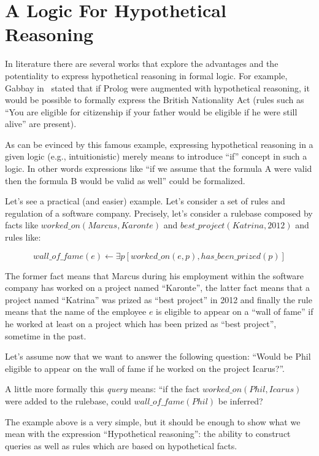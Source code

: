 \section{A Logic For Hypothetical Reasoning}
\label{sec:lfhr}
In literature there are several works that explore the advantages and the potentiality
to express hypothetical reasoning in formal logic.
For example, Gabbay in~\cite{Gabbay1984319} stated that if Prolog
were augmented with hypothetical reasoning,
it would be possible to formally express the British
Nationality Act (rules such as
``You are eligible for citizenship if your father would be eligible if he were
still alive'' are present).

As can be evinced by this famous example, expressing hypothetical reasoning in a given logic
(e.g., intuitionistic) merely means to introduce ``if'' concept in such a logic.
In other words expressions like
``if we assume that the formula A were valid then the formula B would be valid as well'' could be
formalized.

Let's see a practical (and easier) example. Let's consider a set of rules and regulation of a
software company. Precisely, let's consider a rulebase composed by facts like
$worked\_on(Marcus, Karonte)$ and $best\_project(Katrina, 2012)$ and rules like:

\begin{equation}
  wall\_of\_fame(e) \leftarrow \exists p [worked\_on(e, p), has\_been\_prized(p)]
\end{equation}

The former fact means that Marcus during his employment within the software company has worked
on a project named ``Karonte'', the latter fact means that a project named ``Katrina'' was
prized as ``best project'' in 2012 and finally the rule means
that the name of the employee $e$ is eligible to appear on a ``wall of fame'' if
he worked at least on a project which has been prized as ``best project'',
sometime in the past.

Let's assume now that we want to answer the following question: ``Would
be Phil eligible to appear on the wall of fame if he worked on the project Icarus?''.

A little more formally this \textit{query} means: ``if the fact $worked\_on(Phil, Icarus)$ were
added to the rulebase, could $wall\_of\_fame(Phil)$ be inferred?

The example above is a very simple, but it should be enough to show what we mean
with the expression ``Hypothetical reasoning'': the ability to construct queries as well as
rules which are based on hypothetical facts.

